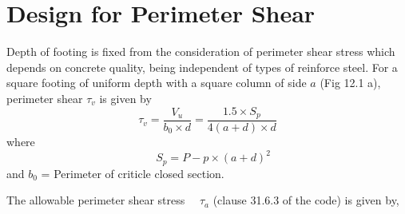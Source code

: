 \documentclass{report}
\begin{document}
\section{Design for Perimeter Shear} Depth of footing is fixed from the
consideration of perimeter shear stress which depends on concrete quality,
being independent of types of reinforce steel. For a square footing of
uniform depth with a square column of side $a$ (Fig 12.1 a), perimeter shear
$\tau_{v}$ is given by
\begin{equation}
\label{eq:perimeterShearStress}
\tau_{v} = \frac{V_{u}} {{b_{0}} \times d} 
=\frac{1.5 \times S_{p}} {4(a + d) \times d} 
\end{equation}
where 
\begin{equation}
\label{eq:perimeterShearForce}
\quad S_{p} = P - p \times (a + d)^2
\end{equation}
and $b_0$ = Perimeter of criticle closed section.

The allowable perimeter shear stress $\quad{\tau_{a}}$ (clause 31.6.3 of
the code) is given by,

\end{document}
